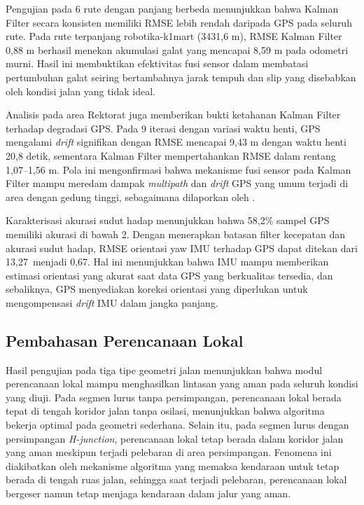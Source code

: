 Pengujian pada 6 rute dengan panjang berbeda menunjukkan bahwa Kalman Filter secara konsisten memiliki RMSE lebih rendah daripada GPS pada seluruh rute.
Pada rute terpanjang robotika-k1mart (3431,6 m), RMSE Kalman Filter 0,88 m berhasil menekan akumulasi galat yang mencapai 8,59 m pada odometri murni.
Hasil ini membuktikan efektivitas fusi sensor dalam membatasi pertumbuhan galat seiring bertambahnya jarak tempuh dan slip yang disebabkan oleh kondisi jalan yang tidak ideal.

Analisis pada area Rektorat juga memberikan bukti ketahanan Kalman Filter terhadap degradasi GPS.
Pada 9 iterasi dengan variasi waktu henti, GPS mengalami \emph{drift} signifikan dengan RMSE mencapai 9,43 m dengan waktu henti 20,8 detik, sementara Kalman Filter mempertahankan RMSE dalam rentang 1,07--1,56 m.
Pola ini mengonfirmasi bahwa mekanisme fusi sensor pada Kalman Filter mampu meredam dampak \emph{multipath} dan \emph{drift} GPS yang umum terjadi di area dengan gedung tinggi, sebagaimana dilaporkan oleh \textcite{Lee2022ResilientNavigation}.

Karakterisasi akurasi sudut hadap menunjukkan bahwa 58,2\% sampel GPS memiliki akurasi di bawah 2\textdegree.
Dengan menerapkan batasan filter kecepatan dan akurasi sudut hadap, RMSE orientasi yaw IMU terhadap GPS dapat ditekan dari 13,27\textdegree\ menjadi 0,67\textdegree.
Hal ini menunjukkan bahwa IMU mampu memberikan estimasi orientasi yang akurat saat data GPS yang berkualitas tersedia, dan sebaliknya, GPS menyediakan koreksi orientasi yang diperlukan untuk mengompensasi \emph{drift} IMU dalam jangka panjang.

\subsection{Pembahasan Perencanaan Lokal}
\label{sec:bahas_planner}

Hasil pengujian pada tiga tipe geometri jalan menunjukkan bahwa modul perencanaan lokal mampu menghasilkan lintasan yang aman pada seluruh kondisi yang diuji.
Pada segmen lurus tanpa persimpangan, perencanaan lokal berada tepat di tengah koridor jalan tanpa osilasi, menunjukkan bahwa algoritma bekerja optimal pada geometri sederhana.
Selain itu, pada segmen lurus dengan persimpangan \emph{H-junction}, perencanaan lokal tetap berada dalam koridor jalan yang aman meskipun terjadi pelebaran di area persimpangan.
Fenomena ini diakibatkan oleh mekanisme algoritma yang memaksa kendaraan untuk tetap berada di tengah ruas jalan, sehingga saat terjadi pelebaran, perencanaan lokal bergeser namun tetap menjaga kendaraan dalam jalur yang aman.

